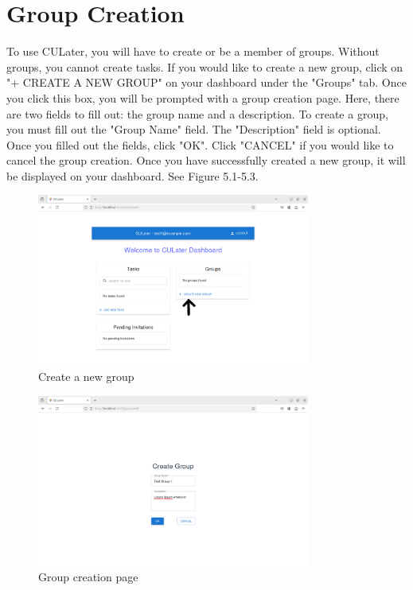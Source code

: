 \documentclass{scrreprt}
\begin{document}
\chapter{Group Creation}

To use CULater, you will have to create or be a member of groups. Without groups, you cannot create tasks. If you would like to create a new group, click on "+ CREATE A NEW GROUP" on your dashboard under the "Groups" tab. Once you click this box, you will be prompted with a group creation page. Here, there are two fields to fill out: the group name and a description. To create a group, you must fill out the "Group Name" field. The "Description" field is optional. Once you filled out the fields, click "OK". Click "CANCEL" if you would like to cancel the group creation. Once you have successfully created a new group, it will be displayed on your dashboard. See Figure 5.1-5.3.\\
\begin{figure}[htbp]
        \centering
        \includegraphics[width=0.8\textwidth]{dashboard_view_new_group.png}
	\caption{Create a new group}
	\label{fig:my_label}
\end{figure}
\begin{figure}[htbp]
        \centering
        \includegraphics[width=0.8\textwidth]{group_creation.png}
	\caption{Group creation page}
	\label{fig:my_label}
\end{figure}
\end{document}

